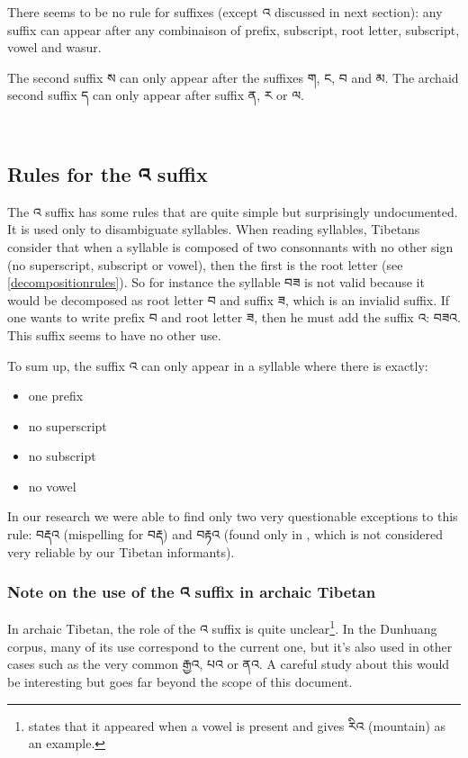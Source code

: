 \documentclass[%
a4paper,%
pagesize,%
12pt,%
parskip=off,%
bibliography=totoc,%
numbers=noenddot,%
DIV=12,%
twoside=semi,%
headings=normal%
]{scrartcl}
\begin{document}
There seems to be no rule for suffixes (except འ discussed in next section): any suffix can appear after any combinaison of prefix, subscript, root letter, subscript, vowel and wasur.

The second suffix ས can only appear after the suffixes ག, ང, བ and མ. The archaid second suffix ད can only appear after suffix ན, ར or ལ.

­\subsection{Rules for the འ suffix}

The འ suffix has some rules that are quite simple but surprisingly undocumented. It is used only to disambiguate syllables. When reading syllables, Tibetans consider that when a syllable is composed of two consonnants with no other sign (no superscript, subscript or vowel), then the first is the root letter (see \ref{decompositionrules}). So for instance the syllable བཟ is not valid because it would be decomposed as root letter བ and suffix ཟ, which is an invialid suffix. If one wants to write prefix བ and root letter ཟ, then he must add the suffix འ: བཟའ. This suffix seems to have no other use. 

To sum up, the suffix འ can only appear in a syllable where there is exactly:

\begin{itemize}
\item one prefix
\item no superscript
\item no subscript
\item no vowel
\end{itemize}

In our research we were able to find only two very questionable exceptions to this rule: བརྡའ (mispelling for བརྡ) and བརྟའ (found only in \cite{KhartoTenses}, which is not considered very reliable by our Tibetan informants).

\subsubsection*{Note on the use of the འ suffix in archaic Tibetan}

In archaic Tibetan, the role of the འ suffix is quite unclear\footnote{\cite{TournadreMST} states that it appeared when a vowel is present and gives རིའ (mountain) as an example.}. In the Dunhuang corpus, many of its use correspond to the current one, but it's also used in other cases such as the very common རྒྱའ, པའ or ནའ. A careful study about this would be interesting but goes far beyond the scope of this document.
\end{document}
